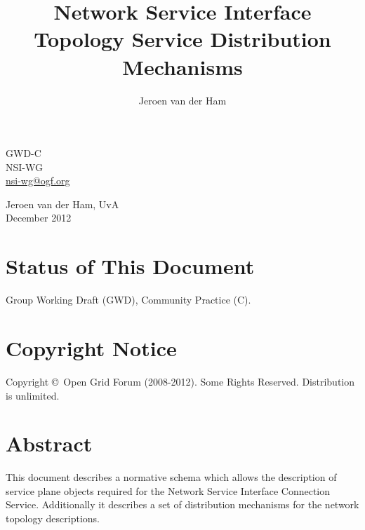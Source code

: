 \documentclass[12pt]{article}  %
\title{Network Service Interface Topology Service Distribution Mechanisms}
\author{Jeroen van der Ham}
\newcommand{\headerstyle}{\sffamily} %
\newcommand{\ifnonempty}[2]{\ifthenelse{\isundefined{#1}}{}{\ifthenelse{\equal{#1}{}}{}{#2}}}
\newcommand{\authorsshort}{Jeroen van der Ham, UvA}
\newcommand{\publicationdate}{December 2012}  %
\newcommand{\copyrightyears}{2008-2012}  %
\newcommand{\docseries}{GWD-C}  %
\begin{document}
{\noindent
\begin{minipage}[t]{1.5in}
\headerstyle
\docseries \\
NSI-WG \\
\href{mailto:nsi-wg@ogf.org}{nsi-wg@ogf.org}
\end{minipage}
\hfill
\raggedleft
\begin{minipage}[t]{4.5in}
\raggedleft
\headerstyle
\authorsshort \\
\vspace{1em}
\publicationdate \\
\ifnonempty{\revisiondate}{Revised \revisiondate \\}
\end{minipage}
}

\vspace{1em}
\begin{center}
\makeatletter
\Large\bf\textsf \@title
\makeatother
\end{center}


\section*{Status of This Document}

Group Working Draft (GWD), Community Practice (C).


% 

\section*{Copyright Notice}

Copyright \copyright \ Open Grid Forum (\copyrightyears).  Some Rights Reserved.  
Distribution is unlimited.

\section*{Abstract}

This document describes a normative schema which allows the
description of service plane objects required for the Network Service Interface Connection Service. Additionally it describes a set of distribution mechanisms for the network topology descriptions.
\end{document}
